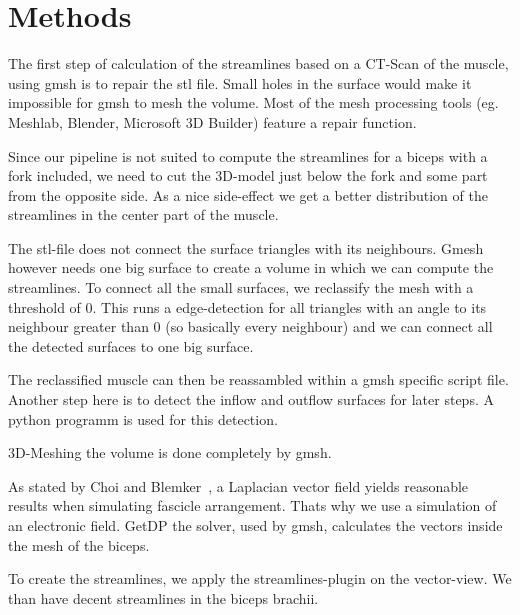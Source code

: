 \documentclass[preprint,journal]{vgtc}       %
\begin{document}
\section{Methods}
The first step of calculation of the streamlines based on a CT-Scan of the muscle, using gmsh is to repair the stl file. Small holes in the surface would make it impossible for gmsh to mesh the volume. Most of the mesh processing tools (eg. Meshlab, Blender, Microsoft 3D Builder) feature a repair function. 

Since our pipeline is not suited to compute the streamlines for a biceps with a fork included, we need to cut the 3D-model just below the fork and some part from the opposite side. As a nice side-effect we get a better distribution of the streamlines in the center part of the muscle.

The stl-file does not connect the surface triangles with its neighbours. Gmesh however needs one big surface to create a 
volume in which we can compute the streamlines. To connect all the small surfaces, we reclassify the mesh with a threshold of 0.
This runs a edge-detection for all triangles with an angle to its neighbour greater than 0 (so basically every neighbour) and we can connect all the 
detected surfaces to one big surface.

The reclassified muscle can then be reassambled within a gmsh specific script file. Another step here is to detect the inflow and outflow surfaces for later steps. A python programm is used for this detection. 

3D-Meshing the volume is done completely by gmsh.
 
As stated by Choi and Blemker~\cite{Choi2013}, a Laplacian vector field yields reasonable results when simulating fascicle arrangement. Thats why we use a simulation of an electronic field. GetDP the solver, used by gmsh, calculates the vectors  inside the mesh of the biceps.

To create the streamlines, we apply the streamlines-plugin on the vector-view. We than have decent streamlines in the biceps brachii.
\end{document}
